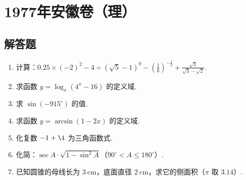 \chapter{1977年安徽卷（理）}

\section{解答题}

\begin{problem}
\begin{enumerate}
    \item 计算：\(0.25\times\left( -2 \right)^2-4\div\left( \sqrt{5}-1 \right)^0-\left( \frac{1}{6} \right)^{-\frac{1}{2}}+\frac{\sqrt{3}}{\sqrt{3}-\sqrt{2}}\).
    \item 求函数 \(y=\log_x\left( 4^x-16 \right)\) 的定义域.
    \item 求 \(\sin\left( -915^\circ \right)\) 的值.
    \item 求函数 \(y=\arcsin\left( 1-2x \right)\) 的定义域.
    \item 化复数 \(-1+\i\) 为三角函数式.
    \item 化简：\(\sec A\cdot\sqrt{1-\sin^2 A}\)（\(90^\circ<A\leqslant180^\circ\)）.
    \item 已知圆锥的母线长为 \(3 \mathrm{~cm}\)，底面直径 \(2 \mathrm{~cm}\)，求它的侧面积（\(\pi\) 取 \(3.14\)）.
\end{enumerate}
\end{problem}

